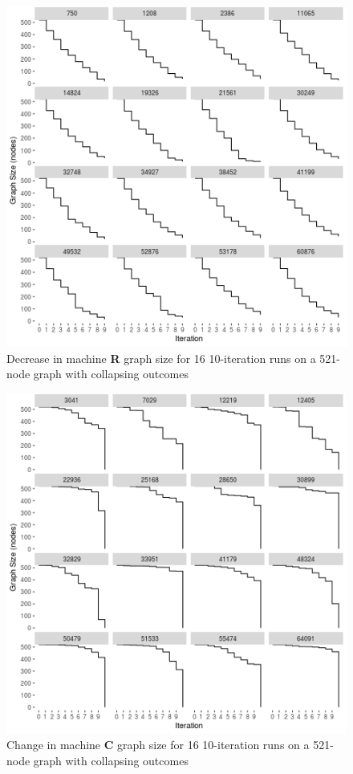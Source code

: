 \documentclass{tufte-handout}
\begin{document}
{\begin{figure}[htb]
\includegraphics{rcol_stepdown.png}
\caption{Decrease in machine \textbf{R} graph size for 16 10-iteration runs
on a 521-node graph with collapsing outcomes}
\label{fig:RCollapseDynamics}
\end{figure}

\begin{figure}[htb]
\includegraphics{ccol_stepdown.png}
\caption{Change in machine \textbf{C} graph size for 16 10-iteration runs
on a 521-node graph with collapsing outcomes}
\label{fig:CCollapseDynamics}
\end{figure}

}
\end{document}
